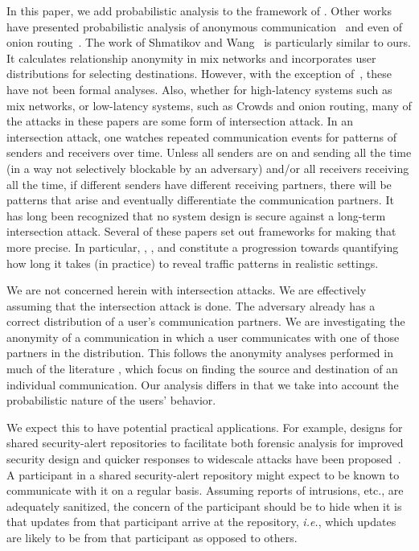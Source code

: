 \documentclass[prodmode,acmtissec]{acmsmall}
\begin{document}
In this paper, we add probabilistic analysis to the framework of . Other works have presented probabilistic analysis of anonymous communication~\cite{crowds:tissec,SHMAT,WRIGHT,statistical-disclosure,DanSer04,e2e-traffic,stop-and-go} and even of onion routing~\cite{onion-routing:pet2000}.  The work of Shmatikov and Wang~ is particularly similar to ours.  It calculates relationship anonymity in mix networks and incorporates user distributions for selecting destinations.  However, with the exception of~\cite{SHMAT}, these have not been formal analyses. Also, whether for high-latency systems such as mix networks, or low-latency systems, such as Crowds and onion routing, many of the attacks in these papers are some form of intersection attack. In an intersection attack, one watches repeated communication events for patterns of senders and receivers over time. Unless all senders are on and sending all the time (in a way not selectively blockable by an adversary) and/or all receivers receiving all the time, if different senders have different receiving partners, there will be patterns that arise and eventually differentiate the communication partners. It has long been recognized that no system design is secure against a long-term intersection attack. Several of these papers set out frameworks for making that more precise. In particular, \cite{statistical-disclosure}, \cite{DanSer04}, and \cite{e2e-traffic} constitute a progression towards quantifying how long it takes (in practice) to reveal traffic patterns in realistic settings.

We are not concerned herein with intersection attacks. We are effectively assuming that the intersection attack is done. The adversary already has a correct distribution of a user's communication partners.  We are investigating the anonymity of a communication in which a user communicates with one of those partners in the distribution.  This follows the anonymity analyses performed in much of the literature \cite{stop-and-go,MAUW,crowds:tissec,onion-routing:pet2000}, which focus on finding the source and destination of an individual communication.  Our analysis differs in that we take into account the probabilistic nature of the users' behavior.

We expect this to have potential practical applications. For example, designs for shared security-alert repositories to facilitate both forensic analysis for improved security design and quicker responses to widescale attacks have been proposed~\cite{LINCOLN04}.  A participant in a shared security-alert repository might expect to be known to communicate with it on a regular basis. Assuming reports of intrusions, etc., are adequately sanitized, the concern of the participant should be to hide when it is that updates from that participant arrive at the repository, \emph{i.e.}, which updates are likely to be from that participant as opposed to others.
\end{document}
